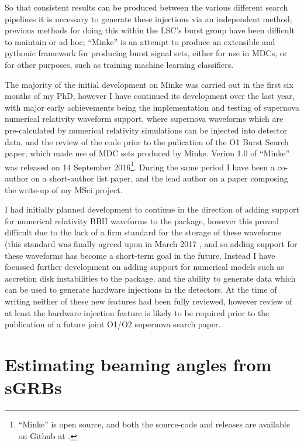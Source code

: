 \documentclass[openleft]{kentigern}
\theoremstyle{definition}
\begin{document}
So that consistent results can be produced between the various
different search pipelines it is necessary to generate these
injections via an independent method; previous methods for doing this
within the LSC's burst group have been difficult to maintain or
ad-hoc; ``Minke'' is an attempt to produce an extensible and pythonic
framework for producing burst signal sets, either for use in MDCs, or
for other purposes, such as training machine learning classifiers.

The majority of the initial development on Minke was carried out in
the first six months of my PhD, however I have continued its
development over the last year, with major early achievements being
the implementation and testing of supernova numerical relativity
waveform support, where supernova waveforms which are pre-calculated
by numerical relativity simulations can be injected into detector
data, and the review of the code prior to the pulication of the O1
Burst Search paper\cite{2017PhRvD..95d2003A}, which made use of MDC
sets produced by Minke. Verion 1.0 of ``Minke'' was released on 14
September 2016\footnote{``Minke'' is open source, and both the
  source-code and releases are available on Github at
  .}.
During the same period I have been a co-author on a short-author list
paper, and the lead author on a paper composing the write-up of my
MSci project.

I had initially planned development to continue in the direction of
adding support for numerical relativity BBH waveforms to the package,
however this proved difficult due to the lack of a firm standard for
the storage of these waveforms (this standard was finally agreed upon
in March 2017 \cite{2017arXiv170301076S}, and so adding support for
these waveforms has become a short-term goal in the future. Instead I
have focussed further development on adding support for numerical
models such as accretion disk instabilities to the package, and the
ability to generate data which can be used to generate hardware
injections in the detectors. At the time of writing neither of these
new features had been fully reviewed, however review of at least the
hardware injection feature is likely to be required prior to the
publication of a future joint O1/O2 supernova search paper.


\section{Estimating beaming angles from sGRBs}
\label{sec:estim-beam-angl}
\end{document}
